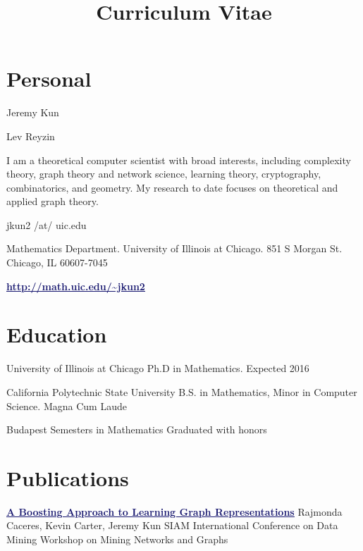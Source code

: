 \documentclass[11pt]{moderncv}
\title{Curriculum Vitae}
\begin{document}
   \maketitle

      \section{Personal}
         {Jeremy Kun}

         {Lev Reyzin}

         {I am a theoretical computer scientist with broad interests, including complexity theory, graph theory and network science, learning theory, cryptography, combinatorics, and geometry. My research to date focuses on theoretical and applied graph theory.}

         {jkun2 /at/ uic.edu}

         {Mathematics Department. University of Illinois at Chicago. 851 S Morgan St. Chicago, IL 60607-7045}

         {\href{http://math.uic.edu/~jkun2}{\textcolor{MidnightBlue}{\underline{\textbf{http://math.uic.edu/\textasciitilde{}jkun2}}}}}


   \section{Education}
         {University of Illinois at Chicago}
      {}
      {Ph.D in Mathematics.}
      {Expected 2016}
      {}

         {California Polytechnic State University}
      {}
      {B.S. in Mathematics, Minor in Computer Science.}
      {Magna Cum Laude}
      {}

         {Budapest Semesters in Mathematics}
      {}
{}
      {Graduated with honors}
      {}


   \section{Publications}
         {\href{http://arxiv.org/abs/1401.3258}{\textcolor{MidnightBlue}{\underline{\textbf{A Boosting Approach to Learning Graph Representations}}}}}
      {Rajmonda Caceres, Kevin Carter, Jeremy Kun}
      {SIAM International Conference on Data Mining Workshop on Mining Networks and Graphs}
      {}
      {}
\end{document}
